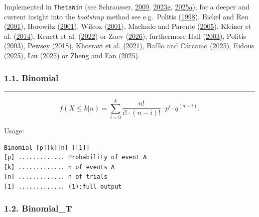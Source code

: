 \documentclass[
]{article}
\begin{document}
Implemented in \texttt{ThetaWin} (see Schrausser,
\href{https://www.academia.edu/81800920}{2009},
\href{https://doi.org/10.5281/zenodo.7659264}{2023g},
\href{https://doi.org/10.5281/zenodo.17880113}{2025a}); for a deeper and
current insight into the \emph{bootstrap} method see e.g.~Politis
(\href{https://doi.org/10.1109/79.647042}{1998}), Bickel and Ren
(\href{http://www.jstor.org/stable/4356107}{2001}), Horowitz
(\href{https://doi.org/10.1016/S1573-4412(01)05005-X}{2001}), Wilcox
(\href{https://doi.org/10.1007/978-1-4757-3522-2_6}{2001}), Machado and
Parente (\href{http://www.jstor.org/stable/23114968}{2005}), Kleiner et
al. (\href{http://www.jstor.org/stable/24774569}{2014}), Kenett et al.
(\href{https://doi.org/10.1007/978-3-031-07566-7_3}{2022}) or Zuev
(\href{https://doi.org/10.1007/978-3-032-03848-7_6}{2026}); furthermore
Hall (\href{http://www.jstor.org/stable/3182845}{2003}), Politis
(\href{https://doi.org/10.1214/ss/1063994977}{2003}), Pewsey
(\href{https://doi.org/10.2307/2348962}{2018}), Khosravi et al.
(\href{https://doi.org/10.1016/j.seps.2020.100781}{2021}), Baíllo and
Cárcamo (\href{https://doi.org/10.1007/s11222-025-10762-z}{2025}),
Eidous (\href{https://doi.org/10.13140/RG.2.2.12238.11846}{2025}), Liu
(\href{https://doi.org/10.1007/s41237-025-00283-4}{2025}) or Zheng and
Fan (\href{https://doi.org/10.3390/math13182913}{2025}).

\hypertarget{binomial}{%
\subsubsection{1.1. Binomial}\label{binomial}}

\begin{center}\rule{0.5\linewidth}{0.5pt}\end{center}

\[f\left( X \leq k|n \right) = \sum_{i = 0}^{k}\frac{n!}{i! \cdot (n - i)!} \cdot p^{i} \cdot q^{(n - i)}.\]

Usage:

\begin{verbatim}
Binomial [p][k][n] [[1]]
[p] ............. Probability of event A
[k] ............. n of events A
[n] ............. n of trials
[1] ............. (1):full output
\end{verbatim}

\hypertarget{binomial_t}{%
\subsubsection{1.2. Binomial\_T}\label{binomial_t}}
\end{document}
